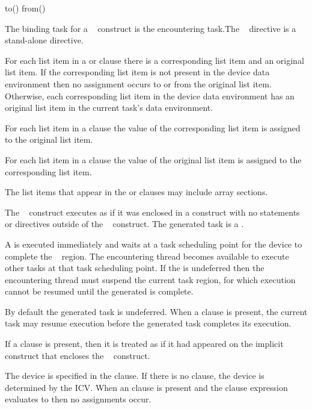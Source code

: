 \begin{indentedcodelist}
to()
from()
\end{indentedcodelist}
\fortranspecificend

\binding
The binding task for a ~ construct is the encountering task.The 
~ directive is a stand-alone directive.

\descr
For each list item in a  or  clause there is a corresponding list item and an 
original list item. If the corresponding list item is not present in the device data environment then no assignment occurs to or from the original list item. Otherwise, each corresponding list item in the 
device data environment has an original list item in the current task's data environment.

For each list item in a  clause the value of the corresponding list item is assigned 
to the original list item.

For each list item in a  clause the value of the original list item is assigned to the 
corresponding list item.

The list items that appear in the  or  clauses may include array sections.

The ~ construct executes as if it was enclosed in a  construct with no statements or directives outside of the ~ construct. The generated task is a .

A  is executed immediately and waits at a task scheduling point for the device to complete the ~ region. The encountering thread becomes available to execute other tasks at that task scheduling point. If the  is undeferred then the encountering thread must suspend the current task region, for which execution cannot be resumed until the generated  is complete.

By default the generated task is undeferred. When a  clause is present, the current task may resume execution before the generated task completes its execution.

If a  clause is present, then it is treated as if it had appeared on the implicit  construct that encloses the ~ construct.

The device is specified in the  clause. If there is no  clause, the device 
is determined by the  ICV. When an  clause is present and the  
clause expression evaluates to  then no assignments occur.

